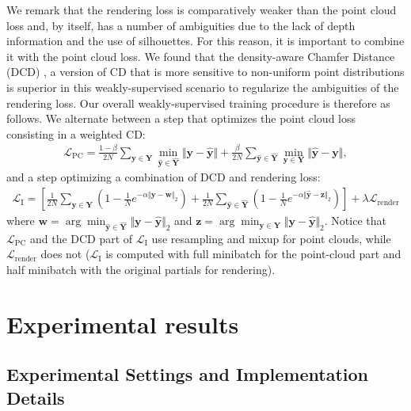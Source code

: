 \documentclass{article}
\newcommand{\yb}{\mathbf{y}}
\newcommand{\wb}{\mathbf{w}}
\newcommand{\zb}{\mathbf{z}}
\newcommand{\Yb}{\mathbf{Y}}
\begin{document}
We remark that the rendering loss is comparatively weaker than the point cloud loss and, by itself, has a number of ambiguities due to the lack of depth information and the use of silhouettes. For this reason, it is important to combine it with the point cloud loss. We found that the density-aware Chamfer Distance (DCD) \cite{balancedcd}, a version of CD that is more sensitive to non-uniform point distributions is superior in this weakly-supervised scenario to regularize the ambiguities of the rendering loss. Our overall weakly-supervised training procedure is therefore as follows. We alternate between a step that optimizes the point cloud loss consisting in a weighted CD:
\begin{align}
    \label{eq:WCD}
    \mathcal{L}_\text{PC} = \frac{1-\beta}{2N}\sum_{\yb \in \Yb} \min_{\hat{\yb} \in \hat{\Yb}} \Vert \yb-\hat{\yb} \Vert + \frac{\beta}{2N}\sum_{\hat{\yb} \in \hat{\Yb}} \min_{\yb \in \Yb} \Vert \hat{\yb}-\yb \Vert,
\end{align}
and a step optimizing a combination of DCD and rendering loss:
\begin{align}
    \label{eq:LI}
    \mathcal{L}_\text{I} = \left[ \frac{1}{2N}\sum_{\yb \in \Yb} \left( 1 - \frac{1}{N} e^{-\alpha\Vert \yb-\wb \Vert_2} \right) +
    \frac{1}{2N}\sum_{\hat{\yb} \in \hat{\Yb}} \left( 1 - \frac{1}{N} e^{-\alpha\Vert \hat{\yb}-\zb \Vert_2} \right) \right] + \lambda \mathcal{L}_\text{render}
\end{align}
where $\wb = \arg\min_{\hat{\yb} \in \hat{\Yb}} \Vert \yb - \hat{\yb} \Vert_2$ and $\zb = \arg\min_{\yb \in \Yb} \Vert \yb - \hat{\yb} \Vert_2$. Notice that $\mathcal{L}_\text{PC}$ and the DCD part of $\mathcal{L}_\text{I}$ use resampling and mixup for point clouds, while $\mathcal{L}_\text{render}$ does not ($\mathcal{L}_\text{I}$ is computed with full minibatch for the point-cloud part and half minibatch with the original partials for rendering).







\section{Experimental results}\label{sec:exp}

\subsection{Experimental Settings and Implementation Details}
\end{document}
